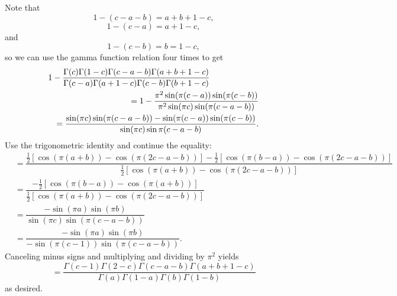 \begin{solution}
Note that
$$1-(c-a-b)=a+b+1-c,$$
$$1-(c-a)=a+1-c,$$
and
$$1-(c-b)=b=1-c,$$
so we can use the gamma function relation four times to get
\begin{eqnarray*}
\lefteqn{1 - \dfrac{\Gamma(c)\Gamma(1-c)\Gamma(c-a-b)\Gamma(a+b+1-c)}{\Gamma(c-a)\Gamma(a+1-c)\Gamma(c-b)\Gamma(b+1-c)}} \\
& &= 1 - \dfrac{\pi^2 \sin(\pi(c-a)) \sin(\pi(c-b))}{\pi^2 \sin(\pi c) \sin (\pi(c-a-b))} \\
& &= \dfrac{\sin(\pi c) \sin (\pi(c-a-b)) - \sin (\pi(c-a)) \sin (\pi(c-b))}{\sin(\pi c)\sin \pi(c-a-b)}.
\end{eqnarray*}
Use the trigonometric identity and continue the equality:
$$\begin{array}{ll}
&=\!\dfrac{\frac{1}{2}[\cos(\pi(a+b))\!-\!\cos(\pi(2c-a-b))]\!-\!\frac{1}{2}[\cos(\pi(b-a))\!-\!\cos(\pi(2c-a-b))]}{\frac{1}{2}[\cos(\pi(a+b))\!-\!\cos(\pi(2c-a-b))]} \\
&= \dfrac{-\frac{1}{2} [ \cos(\pi (b-a)) - \cos(\pi (a+b))]}{\frac{1}{2}[\cos(\pi(a+b)) - \cos(\pi(2c-a-b))]} \\
&= \dfrac{-\sin (\pi a) \sin(\pi b)}{\sin (\pi c) \sin(\pi(c-a-b))} \\
&= \dfrac{-\sin(\pi a) \sin(\pi b)}{-\sin(\pi(c-1)) \sin(\pi(c-a-b))}.
\end{array}$$
Canceling minus signs and multiplying and dividing by $\pi^2$ yields
$$= \dfrac{\Gamma(c-1)\Gamma(2-c)\Gamma(c-a-b)\Gamma(a+b+1-c)}{\Gamma(a)\Gamma(1-a)\Gamma(b)\Gamma(1-b)}$$
as desired.
\end{solution}